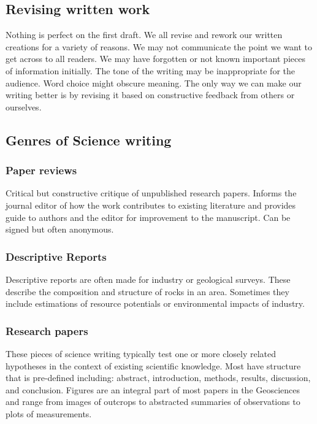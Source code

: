 \documentclass[11pt,]{article}
\begin{document}
\hypertarget{revising-written-work}{%
\subsection{Revising written work}\label{revising-written-work}}

Nothing is perfect on the first draft. We all revise and rework our
written creations for a variety of reasons. We may not communicate the
point we want to get across to all readers. We may have forgotten or not
known important pieces of information initially. The tone of the writing
may be inappropriate for the audience. Word choice might obscure
meaning. The only way we can make our writing better is by revising it
based on constructive feedback from others or ourselves.

\hypertarget{genres-of-science-writing}{%
\subsection{Genres of Science writing}\label{genres-of-science-writing}}

\hypertarget{paper-reviews}{%
\subsubsection{Paper reviews}\label{paper-reviews}}

Critical but constructive critique of unpublished research papers.
Informs the journal editor of how the work contributes to existing
literature and provides guide to authors and the editor for improvement
to the manuscript. Can be signed but often anonymous.

\hypertarget{descriptive-reports}{%
\subsubsection{Descriptive Reports}\label{descriptive-reports}}

Descriptive reports are often made for industry or geological surveys.
These describe the composition and structure of rocks in an area.
Sometimes they include estimations of resource potentials or
environmental impacts of industry.

\hypertarget{research-papers}{%
\subsubsection{Research papers}\label{research-papers}}

These pieces of science writing typically test one or more closely
related hypotheses in the context of existing scientific knowledge. Most
have structure that is pre-defined including: abstract, introduction,
methods, results, discussion, and conclusion. Figures are an integral
part of most papers in the Geosciences and range from images of outcrops
to abstracted summaries of observations to plots of measurements.
\end{document}
